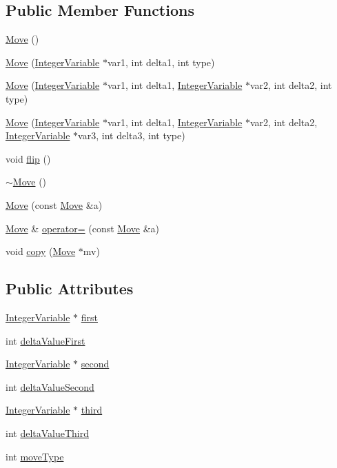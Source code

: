 \subsection*{Public Member Functions}
\begin{DoxyCompactItemize}
\item 
\hyperlink{class_move_a4b1acc3a67d30c385ad9a6000526393a}{Move} ()
\item 
\hyperlink{class_move_a8851c92e7022c7c1958a01c5c4afaf9e}{Move} (\hyperlink{class_integer_variable}{Integer\-Variable} $\ast$var1, int delta1, int type)
\item 
\hyperlink{class_move_a2f898e7978074ce739c0c46d16b3917c}{Move} (\hyperlink{class_integer_variable}{Integer\-Variable} $\ast$var1, int delta1, \hyperlink{class_integer_variable}{Integer\-Variable} $\ast$var2, int delta2, int type)
\item 
\hyperlink{class_move_ab622b4f540b5d266677f61d2e4e6eff9}{Move} (\hyperlink{class_integer_variable}{Integer\-Variable} $\ast$var1, int delta1, \hyperlink{class_integer_variable}{Integer\-Variable} $\ast$var2, int delta2, \hyperlink{class_integer_variable}{Integer\-Variable} $\ast$var3, int delta3, int type)
\item 
void \hyperlink{class_move_a07a270da8300696c26e6614ef6c66065}{flip} ()
\item 
\hyperlink{class_move_aadd37321983fc477287bf7c6d1c0bacf}{$\sim$\-Move} ()
\item 
\hyperlink{class_move_a707f22adbcdc09ccb78e13f123a76c09}{Move} (const \hyperlink{class_move}{Move} \&a)
\item 
\hyperlink{class_move}{Move} \& \hyperlink{class_move_a3acc32180b60f853bd6445f3a3d84913}{operator=} (const \hyperlink{class_move}{Move} \&a)
\item 
void \hyperlink{class_move_a1438845e97365949d5550328f5aaadc7}{copy} (\hyperlink{class_move}{Move} $\ast$mv)
\end{DoxyCompactItemize}
\subsection*{Public Attributes}
\begin{DoxyCompactItemize}
\item 
\hyperlink{class_integer_variable}{Integer\-Variable} $\ast$ \hyperlink{class_move_ac4f4c8f895b197447e16b70c240b7746}{first}
\item 
int \hyperlink{class_move_ada1a03cd63710abd68c0e4505fe21f7e}{delta\-Value\-First}
\item 
\hyperlink{class_integer_variable}{Integer\-Variable} $\ast$ \hyperlink{class_move_ad2edb78f2d4533cdbc4d8f4ac5909d3f}{second}
\item 
int \hyperlink{class_move_af9a41af4cf88de2eb07d4601bbaf5011}{delta\-Value\-Second}
\item 
\hyperlink{class_integer_variable}{Integer\-Variable} $\ast$ \hyperlink{class_move_a255842251c3916ea715d5093797028c1}{third}
\item 
int \hyperlink{class_move_ad1d160b2033500b68a66337c7e13e657}{delta\-Value\-Third}
\item 
int \hyperlink{class_move_a5ffe8371cd87d9714122dacf913ae238}{move\-Type}
\end{DoxyCompactItemize}


